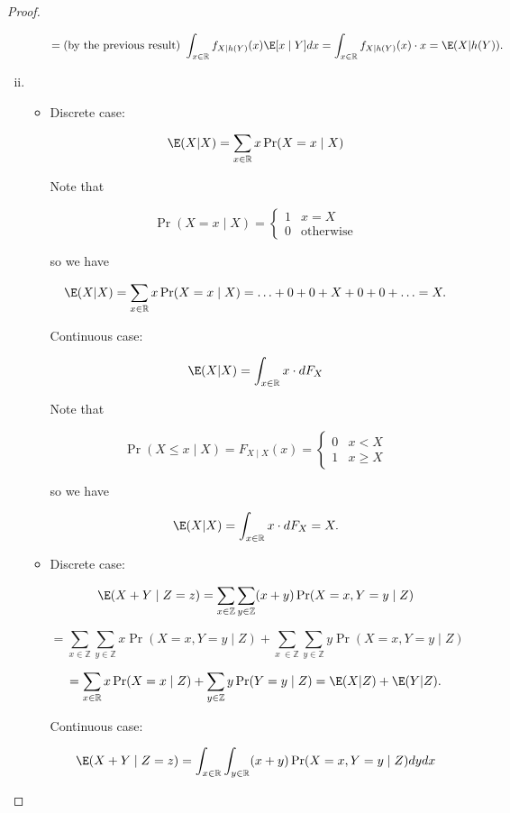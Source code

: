 \begin{proof}
\begin{enumerate}[(i)]
\begin{itemize}
\[
= \text{(by the previous result) }\int_{x \in \mathbb{R}} f_{X \mid h(Y)}(x)  \E[ x   \mid Y] dx   = \int_{x \in \mathbb{R}}f_{X \mid h(Y)}(x)  \cdot x  =\E (X|h(Y)).
\]

\end{itemize}
\item

\begin{itemize}

\item 

Discrete case:

\[
\E (X|X)= \sum_{x \in \mathbb{R}} x \Pr(X = x \mid X)
\]

Note that

\[
\Pr(X = x \mid X) = \begin{cases}
1 & x = X \\
0 & \text{otherwise}
\end{cases}
\]

so we have

\[
\E (X|X)= \sum_{x \in \mathbb{R}} x \Pr(X = x \mid X) = \ldots + 0 + 0 + X + 0 + 0 + \ldots = X.
\]

Continuous case:

\[
\E (X|X)=  \int_{x \in \mathbb{R}} x  \cdot dF_X
\]

Note that

\[
\Pr(X \leq x \mid X) = F_{X \mid X}(x) = \begin{cases}
0 & x < X \\
1 & x \geq X 
\end{cases}
\]


so we have

\[
\E (X|X)= \int_{x \in \mathbb{R}} x  \cdot dF_X = X.
\]

\item 

Discrete case:

\[
\E(X + Y \mid Z = z) = \sum_{x  \in \mathbb{Z}} \sum_{y \in \mathbb{Z}} (x + y) \Pr(X = x, Y = y \mid Z)
\]

\[
= \sum_{x  \in \mathbb{Z}} \sum_{y \in \mathbb{Z}} x\Pr(X = x, Y = y \mid Z) + \sum_{x \ \in \mathbb{Z}} \sum_{y \in \mathbb{Z}} y \Pr(X = x, Y = y \mid Z)
\]

\[
 = \sum_{x \in \mathbb{R}} x \Pr(X = x \mid Z) + \sum_{y \in \mathbb{Z}} y \Pr(Y = y \mid Z) =\E(X|Z)+\E(Y|Z).
\]

Continuous case:

\[
\E(X + Y \mid Z = z) = \int_{x  \in \mathbb{R}} \int_{y \in \mathbb{R}} (x + y) \Pr(X = x, Y = y \mid Z) dy dx
\]


\end{itemize}
\end{enumerate}
\end{proof}
